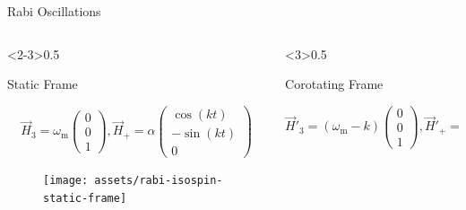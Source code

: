 \documentclass[9pt]{beamer}
\begin{document}
\begin{darkframes}
\begin{frame}{Rabi Oscillations}
{\begin{columns}[T]
\begin{column}<2-3>{0.5\textwidth}

\centering
Static Frame

\begin{equation*}
    \vec H_3 = \omega_{\mathrm m}\begin{pmatrix}
    0 \\
    0\\
    1
    \end{pmatrix}, \vec H_+ = \alpha  \begin{pmatrix}
    \cos( kt) \\
    -\sin(kt)\\
    0
    \end{pmatrix}
\end{equation*}

\begin{figure}
    \centering
    \texttt{[image: assets/rabi-isospin-static-frame]}
\end{figure}


\end{column}%
\begin{column}<3>{0.5\textwidth}

\centering
Corotating Frame

\begin{equation*}
    \vec H'_3 = (\omega_{\mathrm m} - k)\begin{pmatrix}
    0 \\
    0\\
    1
    \end{pmatrix}, \vec H'_+ = \alpha  \begin{pmatrix}
    1 \\
    0\\
    0
    \end{pmatrix}
\end{equation*}


\end{column}
\end{columns}}
\end{frame}
\end{darkframes}
\end{document}
